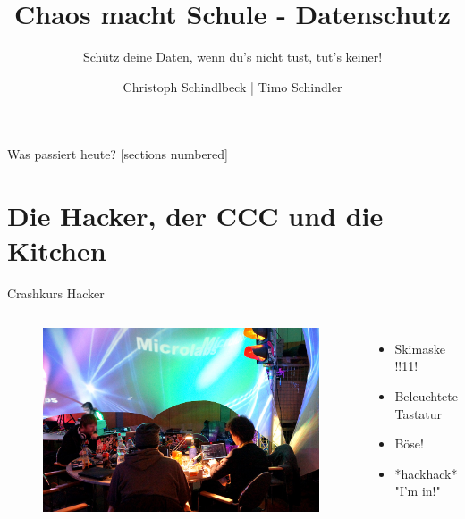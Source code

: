 \documentclass[10pt]{beamer}
\title{Chaos macht Schule - Datenschutz}
\subtitle{Schütz deine Daten, wenn du's nicht tust, tut's keiner!}
\date{}
\author{Christoph Schindlbeck | Timo Schindler}
\institute{Binary Kitchen e.V.}
\begin{document}
\maketitle

\begin{frame}{Was passiert heute?}
  [sections numbered]
  \tableofcontents[hideallsubsections]
\end{frame}

\section{Die Hacker, der CCC und die Kitchen}

%
%
\begin{frame}[fragile]{Crashkurs Hacker}

\begin{columns}[T,c,onlytextwidth]
	\begin{figure}
		\includegraphics[width=1\textwidth]{images/DSC08058}
	\end{figure}

\begin{itemize}
  	\item Skimaske !!11!
  	\item Beleuchtete Tastatur
  	\item Böse!
  	\item *hackhack* "I'm in!"
\end{itemize}
\end{columns}
\end{frame}
\end{document}
